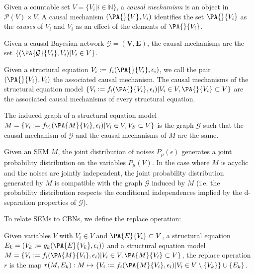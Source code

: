 \begin{definition}
Given a countable set $V=\{V_i|i\in \mathbb{N}\}$, a \emph{causal mechamism} is an object in $\mathscr{P}(V)\times V$. A causal mechanism $(\PA{}{V},V_i)$ identifies the set $\PA{}{V_i}$ as the \emph{causes} of $V_i$ and $V_i$ as an effect of the elements of $\PA{}{V_i}$.
\end{definition}

\begin{definition}
Given a causal Bayesian network $\mathcal{G}=(\mathbf{V},\mathbf{E})$, the causal mechanisms are the set $\{(\PA{\mathcal{G}}{V_i},V_i)|V_i\in V\}$.
\end{definition}

\begin{definition}
Given a structural equation $V_i := f_{i}(\PA{}{V_i},\epsilon_i)$, we call the pair $(\PA{}{V_i},V_i)$ the associated causal mechanism. The causal mechanisms of the structural equation model $\{V_i:= f_{i}(\PA{}{V_i},\epsilon_i)| V_i\in V, \PA{}{V_i}\subset V\}$ are the associated causal mechanisms of every structural equation.
\end{definition}

\begin{definition}
The induced graph of a structural equation model $M=\{V_i:= f_{V_i}(\PA{M}{V_i},\epsilon_i)| V_i\in V, V_S\subset V\}$ is the graph $\mathcal{G}$ such that the causal mechanism of $\mathcal{G}$ and the causal mechanisms of $M$ are the same.
\end{definition}

Given an SEM $M$, the joint distribution of noises $P_\mu(\epsilon)$ generates a joint probability distribution on the variables $P_\mu(V)$. In the case where $M$ is acyclic and the noises are jointly independent, the joint probability distribution generated by $M$ is compatible with the graph $\mathcal{G}$ induced by $M$ (i.e. the probability distribution respects the conditional independences implied by the d-separation properties of $\mathcal{G}$)\cite{pearl_causality:_2009}.

To relate SEMs to CBNs, we define the replace operation:

\begin{definition}
Given variables $V$ with $V_i\in V$ and $\PA{E}{V_i}\subset V$, a structural equation $E_k=(V_k:=g_k(\PA{E}{V_k},\epsilon_i))$ and a structural equation model $M=\{V_i:=f_i(\PA{M}{V_i},\epsilon_i)|V_i\in V, \PA{M}{V_i}\subset V\}$, the replace operation $r$ is the map $r(M,E_k):M\mapsto \{V_i:=f_i(\PA{M}{V_i},\epsilon_i)|V_i\in V\setminus\{V_k\}\}\cup\{E_k\}$.
\end{definition}

